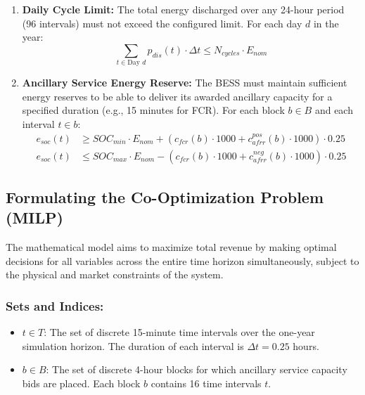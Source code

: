 \begin{enumerate}
    \item \textbf{Daily Cycle Limit:} The total energy discharged over any 24-hour period (96 intervals) must not exceed the configured limit. For each day $d$ in the year:
    \begin{equation}
    \sum_{t \in \text{Day } d} p_{dis}(t) \cdot \Delta t \leq N_{cycles} \cdot E_{nom}
    \end{equation}

    \item \textbf{Ancillary Service Energy Reserve:} The BESS must maintain sufficient energy reserves to be able to deliver its awarded ancillary capacity for a specified duration (e.g., 15 minutes for FCR). For each block $b \in B$ and each interval $t \in b$:
    \begin{align}
    e_{soc}(t) &\geq SOC_{min} \cdot E_{nom} + \left( c_{fcr}(b) \cdot 1000 + c_{afrr}^{pos}(b) \cdot 1000 \right) \cdot 0.25 \\
    e_{soc}(t) &\leq SOC_{max} \cdot E_{nom} - \left( c_{fcr}(b) \cdot 1000 + c_{afrr}^{neg}(b) \cdot 1000 \right) \cdot 0.25
    \end{align}
\end{enumerate}

\subsection{Formulating the Co-Optimization Problem (MILP)}

The mathematical model aims to maximize total revenue by making optimal decisions for all variables across the entire time horizon simultaneously, subject to the physical and market constraints of the system.

\subsubsection{Sets and Indices:}
\begin{itemize}
    \item $t \in T$: The set of discrete 15-minute time intervals over the one-year simulation horizon. The duration of each interval is $\Delta t = 0.25$ hours.
    \item $b \in B$: The set of discrete 4-hour blocks for which ancillary service capacity bids are placed. Each block $b$ contains 16 time intervals $t$.
\end{itemize}

